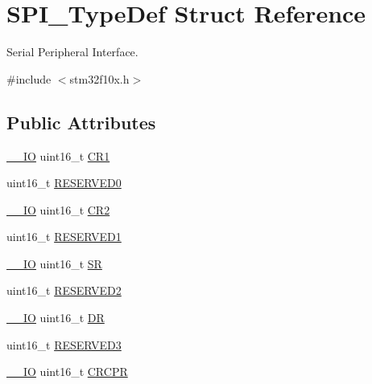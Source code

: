 \hypertarget{struct_s_p_i___type_def}{\section{S\-P\-I\-\_\-\-Type\-Def Struct Reference}
\label{struct_s_p_i___type_def}
}


Serial Peripheral Interface.  




{\ttfamily \#include $<$stm32f10x.\-h$>$}

\subsection*{Public Attributes}
\begin{DoxyCompactItemize}
\item 
\hyperlink{group___c_m_s_i_s__core__definitions_gaec43007d9998a0a0e01faede4133d6be}{\-\_\-\-\_\-\-I\-O} uint16\-\_\-t \hyperlink{struct_s_p_i___type_def_a1e398155ddd013fcdd41309b4bd0bd5f}{C\-R1}
\item 
uint16\-\_\-t \hyperlink{struct_s_p_i___type_def_a7f16c40933b8a713085436be72d30a46}{R\-E\-S\-E\-R\-V\-E\-D0}
\item 
\hyperlink{group___c_m_s_i_s__core__definitions_gaec43007d9998a0a0e01faede4133d6be}{\-\_\-\-\_\-\-I\-O} uint16\-\_\-t \hyperlink{struct_s_p_i___type_def_ac891e34644b8dc27bacc906cfd18b235}{C\-R2}
\item 
uint16\-\_\-t \hyperlink{struct_s_p_i___type_def_a1b7a800c0f56532a431b19cf868e4102}{R\-E\-S\-E\-R\-V\-E\-D1}
\item 
\hyperlink{group___c_m_s_i_s__core__definitions_gaec43007d9998a0a0e01faede4133d6be}{\-\_\-\-\_\-\-I\-O} uint16\-\_\-t \hyperlink{struct_s_p_i___type_def_a017d7d54a7bf1925facea6b5e02fec83}{S\-R}
\item 
uint16\-\_\-t \hyperlink{struct_s_p_i___type_def_a09ce56649bb5477e2fcf3e92bca8f735}{R\-E\-S\-E\-R\-V\-E\-D2}
\item 
\hyperlink{group___c_m_s_i_s__core__definitions_gaec43007d9998a0a0e01faede4133d6be}{\-\_\-\-\_\-\-I\-O} uint16\-\_\-t \hyperlink{struct_s_p_i___type_def_ae192c943732b6ab5e5611e860cc05544}{D\-R}
\item 
uint16\-\_\-t \hyperlink{struct_s_p_i___type_def_aeb1d1d561f1d51232369197fa7acb53a}{R\-E\-S\-E\-R\-V\-E\-D3}
\item 
\hyperlink{group___c_m_s_i_s__core__definitions_gaec43007d9998a0a0e01faede4133d6be}{\-\_\-\-\_\-\-I\-O} uint16\-\_\-t \hyperlink{struct_s_p_i___type_def_a353c64e49ec9ae93b950668941f41175}{C\-R\-C\-P\-R}

\end{DoxyCompactItemize}
